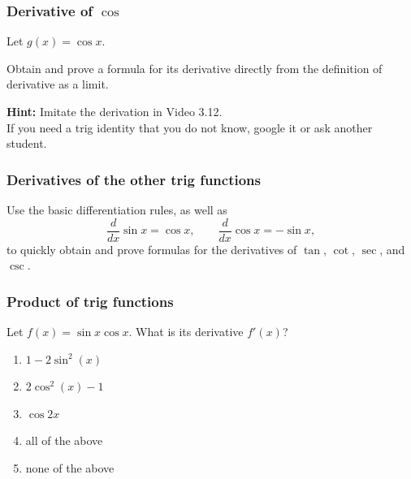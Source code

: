 \documentclass[14pt]{beamer}
\begin{document}
	\begin{frame}[t]
		\frametitle{Derivative of $\cos$}

		Let $\displaystyle g(x) = \cos x.$

		Obtain and prove a formula for its derivative directly from the definition of
		derivative as a limit.

		\vfill

		{\bfseries Hint:} Imitate the derivation in Video 3.12. \\ If you need a trig
		identity that you do not know, google it or ask another student.




	\end{frame}


	\begin{frame}[t]
		\frametitle{Derivatives of the other trig functions}

		Use the basic differentiation rules, as well as
		\[
			\frac{d}{dx}\sin x = \cos x, \quad \quad \frac{d}{dx}\cos x = - \sin x,
		\]
		to quickly obtain and prove formulas for the derivatives of $\tan$, $\cot$, $\sec$,
		and $\csc$.
	\end{frame}


	\begin{frame}
		\frametitle{Product of trig functions}

		Let $f(x)= \sin x \cos x$. What is its derivative $f'(x)$?
		\begin{enumerate}
			\item $1-2\sin^{2}(x)$

			\item $2\cos^{2}(x) -1$

			\item $\cos 2x$

			\item all of the above

			\item none of the above
		\end{enumerate}

	\end{frame}
\end{document}
